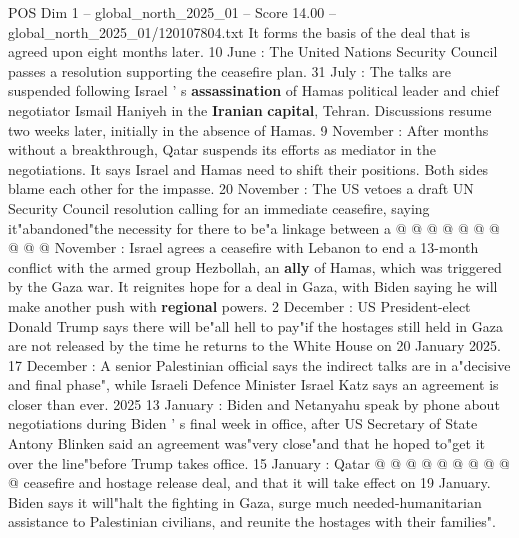 \begin{textsample}{POS Dim 1 – global\_north\_2025\_01 – Score 14.00 – global\_north\_2025\_01/120107804.txt}
It forms the basis of the deal that is agreed upon eight months later. 10 June : The United Nations Security Council passes a resolution supporting the ceasefire plan. 31 July : The talks are suspended following Israel ' s \textbf{assassination} of Hamas political leader and chief negotiator Ismail Haniyeh in the \textbf{Iranian} \textbf{capital}, Tehran.
Discussions resume two weeks later, initially in the absence of Hamas. 9 November : After months without a breakthrough, Qatar suspends its efforts as mediator in the negotiations.
It says Israel and Hamas need to shift their positions.
Both sides blame each other for the impasse. 20 November : The US vetoes a draft UN Security Council resolution calling for an immediate ceasefire, saying it"abandoned"the necessity for there to be"a linkage between a @ @ @ @ @ @ @ @ @ @ November : Israel agrees a ceasefire with Lebanon to end a 13-month conflict with the armed group Hezbollah, an \textbf{ally} of Hamas, which was triggered by the Gaza war.
It reignites hope for a deal in Gaza, with Biden saying he will make another push with \textbf{regional} powers. 2 December : US President-elect Donald Trump says there will be"all hell to pay"if the hostages still held in Gaza are not released by the time he returns to the White House on 20 January 2025. 17 December : A senior Palestinian official says the indirect talks are in a"decisive and final phase", while Israeli Defence Minister Israel Katz says an agreement is closer than ever. 2025 13 January : Biden and Netanyahu speak by phone about negotiations during Biden ' s final week in office, after US Secretary of State Antony Blinken said an agreement was"very close"and that he hoped to"get it over the line"before Trump takes office. 15 January : Qatar @ @ @ @ @ @ @ @ @ @ ceasefire and hostage release deal, and that it will take effect on 19 January.
Biden says it will"halt the fighting in Gaza, surge much needed-humanitarian assistance to Palestinian civilians, and reunite the hostages with their families".

\end{textsample}
